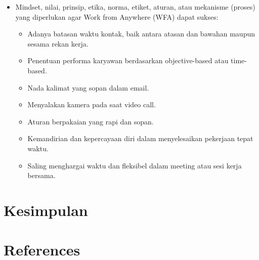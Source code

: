 \documentclass[review]{elsarticle}
\begin{document}
\begin{itemize}
\item Mindset, nilai, prinsip, etika, norma, etiket, aturan, atau mekanisme (proses) yang diperlukan agar Work from Anywhere (WFA) dapat sukses:
\begin{itemize}
\item Adanya batasan waktu kontak, baik antara atasan dan bawahan maupun sesama rekan kerja.
\item Penentuan performa karyawan berdasarkan objective-based atau time-based.
\item Nada kalimat yang sopan dalam email.
\item Menyalakan kamera pada saat video call.
\item Aturan berpakaian yang rapi dan sopan.
\item Kemandirian dan kepercayaan diri dalam menyelesaikan pekerjaan tepat waktu.
\item Saling menghargai waktu dan fleksibel dalam meeting atau sesi kerja bersama.

\end{itemize}
\end{itemize}

\section{Kesimpulan}




\section*{References}
\end{document}
